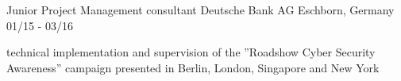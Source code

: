 \begin{cventries}
  \cventry
    {Junior Project Management consultant} %
    {Deutsche Bank AG} %
    {Eschborn, Germany} %
    {01/15 - 03/16} %
    {
      \begin{cvitems} %
        \item {technical implementation and supervision of the ”Roadshow Cyber Security
Awareness” campaign presented in Berlin, London, Singapore and New York}
      \end{cvitems}
    }

\end{cventries}
